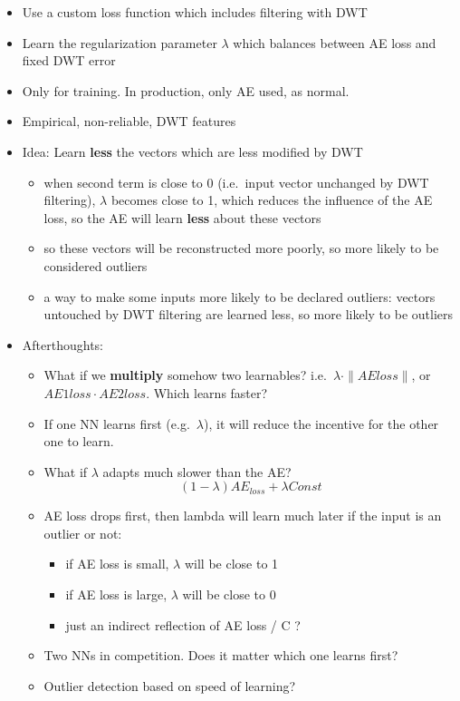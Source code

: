 \documentclass[
  letterpaper,
  DIV=11,
  numbers=noendperiod]{scrartcl}
\providecommand{\tightlist}{%
  \setlength{\itemsep}{0pt}\setlength{\parskip}{0pt}}\usepackage{longtable,booktabs,array}
\begin{document}
\begin{itemize}
\tightlist
\item
  Use a custom loss function which includes filtering with DWT
\item
  Learn the regularization parameter \(\lambda\) which balances between
  AE loss and fixed DWT error
\item
  Only for training. In production, only AE used, as normal.
\item
  Empirical, non-reliable, DWT features
\item
  Idea: Learn \textbf{less} the vectors which are less modified by DWT

  \begin{itemize}
  \tightlist
  \item
    when second term is close to 0 (i.e.~input vector unchanged by DWT
    filtering), \(\lambda\) becomes close to 1, which reduces the
    influence of the AE loss, so the AE will learn \textbf{less} about
    these vectors
  \item
    so these vectors will be reconstructed more poorly, so more likely
    to be considered outliers
  \item
    a way to make some inputs more likely to be declared outliers:
    vectors untouched by DWT filtering are learned less, so more likely
    to be outliers
  \end{itemize}
\item
  Afterthoughts:

  \begin{itemize}
  \tightlist
  \item
    What if we \textbf{multiply} somehow two learnables?
    i.e.~\(\lambda \cdot \| AE loss \|\), or
    \(AE1 loss \cdot AE2 loss\). Which learns faster?
  \item
    If one NN learns first (e.g.~\(\lambda\)), it will reduce the
    incentive for the other one to learn.
  \item
    What if \(\lambda\) adapts much slower than the AE?
    \[(1 - \lambda) AE_{loss}  + \lambda Const\]
  \item
    AE loss drops first, then lambda will learn much later if the input
    is an outlier or not:

    \begin{itemize}
    \tightlist
    \item
      if AE loss is small, \(\lambda\) will be close to 1
    \item
      if AE loss is large, \(\lambda\) will be close to 0
    \item
      just an indirect reflection of AE loss / C ?
    \end{itemize}
  \item
    Two NNs in competition. Does it matter which one learns first?
  \item
    Outlier detection based on speed of learning?
  \end{itemize}
\end{itemize}
\end{document}
